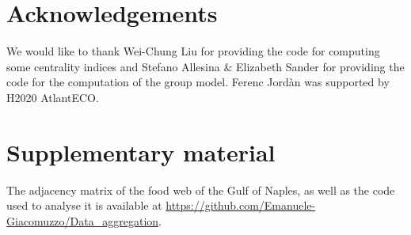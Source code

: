 \documentclass[twocolumn]{article}
\begin{document}
\section*{Acknowledgements}

	We would like to thank Wei-Chung Liu for providing the code for computing some centrality indices and Stefano Allesina \& Elizabeth Sander for providing the code for the  computation of the group model. Ferenc Jordàn was supported by H2020 AtlantECO.

\section*{Supplementary material}

	The adjacency matrix of the food web of the Gulf of Naples, as well as the code used to analyse it is available at \url{https://github.com/Emanuele-Giacomuzzo/Data_aggregation}.



\end{document}
